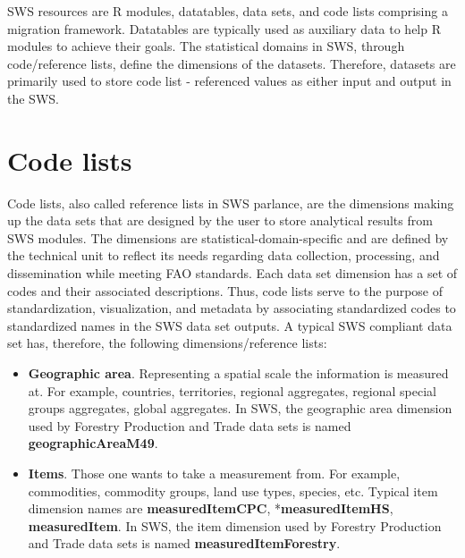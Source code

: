 \documentclass[
]{book}
\begin{document}
SWS resources are R modules, datatables, data sets, and code lists comprising a migration framework. Datatables are typically used as auxiliary data to help R modules to achieve their goals. The statistical domains in SWS, through code/reference lists, define the dimensions of the datasets. Therefore, datasets are primarily used to store code list - referenced values as either input and output in the SWS.

\hypertarget{code-lists}{%
\section{Code lists}\label{code-lists}}

Code lists, also called reference lists in SWS parlance, are the dimensions making up the data sets that are designed by the user to store analytical results from SWS modules. The dimensions are statistical-domain-specific and are defined by the technical unit to reflect its needs regarding data collection, processing, and dissemination while meeting FAO standards. Each data set dimension has a set of codes and their associated descriptions. Thus, code lists serve to the purpose of standardization, visualization, and metadata by associating standardized codes to standardized names in the SWS data set outputs. A typical SWS compliant data set has, therefore, the following dimensions/reference lists:

\begin{itemize}
\item
  \textbf{Geographic area}. Representing a spatial scale the information is measured at. For example, countries, territories, regional aggregates, regional special groups aggregates, global aggregates. In SWS, the geographic area dimension used by Forestry Production and Trade data sets is named \textbf{geographicAreaM49}.
\item
  \textbf{Items}. Those one wants to take a measurement from. For example, commodities, commodity groups, land use types, species, etc. Typical item dimension names are \textbf{measuredItemCPC}, *\textbf{measuredItemHS}, \textbf{measuredItem}. In SWS, the item dimension used by Forestry Production and Trade data sets is named \textbf{measuredItemForestry}.
\end{itemize}
\end{document}
